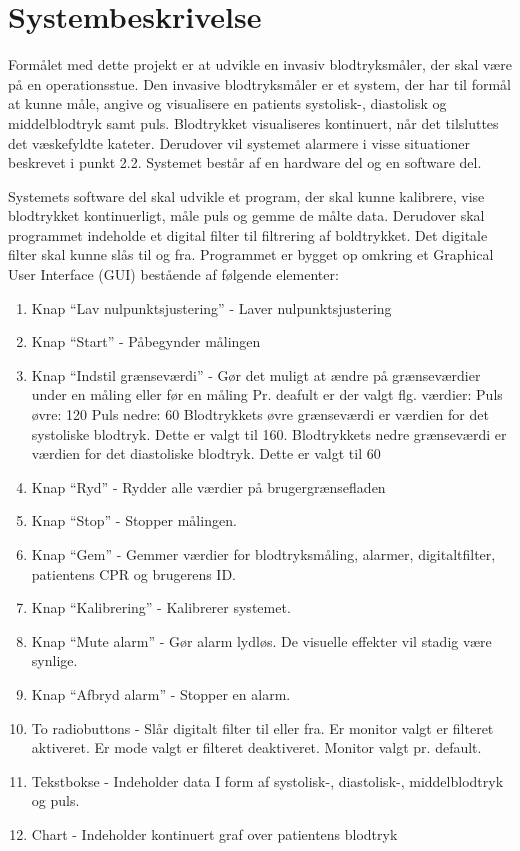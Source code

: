 \section{Systembeskrivelse}
Formålet med dette projekt er at udvikle en invasiv blodtryksmåler, der skal være på en operationsstue. Den invasive blodtryksmåler er et system, der har til formål at kunne måle, angive og visualisere en patients systolisk-, diastolisk og middelblodtryk samt puls. Blodtrykket visualiseres kontinuert, når det tilsluttes det væskefyldte kateter. Derudover vil systemet alarmere i visse situationer beskrevet i punkt 2.2.
Systemet består af en hardware del og en software del. 


Systemets software del skal udvikle et program, der skal kunne kalibrere, vise blodtrykket kontinuerligt, måle puls og gemme de målte data. Derudover skal programmet indeholde et digital filter til filtrering af boldtrykket. Det digitale filter skal kunne slås til og fra. Programmet er bygget op omkring et Graphical User Interface (GUI) bestående af følgende elementer:
\vspace{0.7 cm}

\begin{enumerate}[2.1.]
	\item Knap “Lav nulpunktsjustering” - Laver nulpunktsjustering
	\item Knap “Start” - Påbegynder målingen
	\item Knap “Indstil grænseværdi” - Gør det muligt at ændre på grænseværdier under en måling eller før en måling Pr. deafult er der valgt flg. værdier: 
	Puls øvre: 120
	Puls nedre: 60
	Blodtrykkets øvre grænseværdi er værdien for det systoliske blodtryk. Dette er valgt til 160. 
	Blodtrykkets nedre grænseværdi er værdien for det diastoliske blodtryk. Dette er valgt til 60 
	\item Knap “Ryd” - Rydder alle værdier på brugergrænsefladen
	\item Knap “Stop” - Stopper målingen.
	\item Knap “Gem” - Gemmer værdier for blodtryksmåling, alarmer, digitaltfilter, patientens CPR og brugerens ID.
	\item Knap “Kalibrering” - Kalibrerer systemet.
	\item Knap “Mute alarm” - Gør alarm lydløs. De visuelle effekter vil stadig være synlige.
	\item Knap “Afbryd alarm” - Stopper en alarm.
	\item To radiobuttons - Slår digitalt filter til eller fra. Er monitor valgt er filteret aktiveret. Er mode valgt er filteret deaktiveret. Monitor valgt pr. default. 
	\item Tekstbokse - Indeholder data I form af systolisk-, diastolisk-, middelblodtryk og puls. 
	\item Chart - Indeholder kontinuert graf over patientens blodtryk
\end{enumerate}

